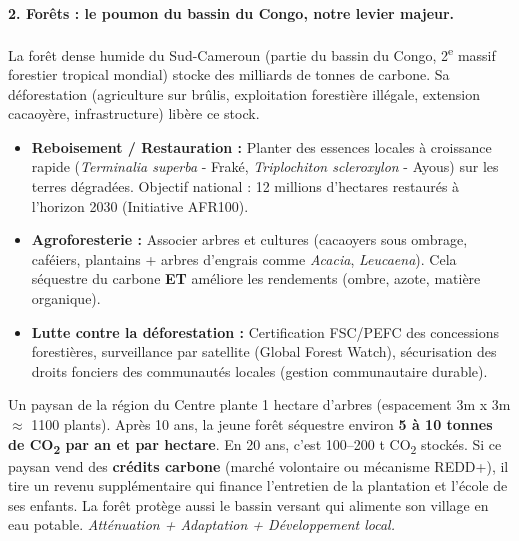 \documentclass[11pt]{article}
\begin{document}
\paragraph{2. Forêts : le poumon du bassin du Congo, notre levier majeur.}
La forêt dense humide du Sud-Cameroun (partie du bassin du Congo, 2\textsuperscript{e} massif forestier tropical mondial) stocke des milliards de tonnes de carbone. Sa déforestation (agriculture sur brûlis, exploitation forestière illégale, extension cacaoyère, infrastructure) libère ce stock.
\begin{itemize}
    \item \textbf{Reboisement / Restauration :} Planter des essences locales à croissance rapide (\emph{Terminalia superba} - Fraké, \emph{Triplochiton scleroxylon} - Ayous) sur les terres dégradées. Objectif national : 12 millions d'hectares restaurés à l'horizon 2030 (Initiative AFR100).
    \item \textbf{Agroforesterie :} Associer arbres et cultures (cacaoyers sous ombrage, caféiers, plantains + arbres d'engrais comme \emph{Acacia}, \emph{Leucaena}). Cela séquestre du carbone \textbf{ET} améliore les rendements (ombre, azote, matière organique).
    \item \textbf{Lutte contre la déforestation :} Certification FSC/PEFC des concessions forestières, surveillance par satellite (Global Forest Watch), sécurisation des droits fonciers des communautés locales (gestion communautaire durable).
\end{itemize}

\begin{exemplebox}
Un paysan de la région du Centre plante 1 hectare d'arbres (espacement 3m x 3m $\approx$ 1100 plants). Après 10 ans, la jeune forêt séquestre environ \textbf{5 à 10 tonnes de CO\textsubscript{2} par an et par hectare}. En 20 ans, c'est 100--200 t CO\textsubscript{2} stockés. Si ce paysan vend des \textbf{crédits carbone} (marché volontaire ou mécanisme REDD+), il tire un revenu supplémentaire qui finance l'entretien de la plantation et l'école de ses enfants. La forêt protège aussi le bassin versant qui alimente son village en eau potable. \emph{Atténuation + Adaptation + Développement local.}
\end{exemplebox}
\end{document}
